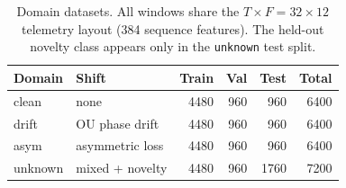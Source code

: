 \begin{table}[t]
\centering
\caption{Domain datasets. All windows share the $T{\times}F = 32{\times}12$ telemetry layout (384 sequence features). The held-out novelty class appears only in the \texttt{unknown} test split.}
\label{tab:datasets}
\begin{tabular}{llrrrr}
\toprule
Domain & Shift & Train & Val & Test & Total \\
\midrule
clean & none & 4480 & 960 & 960 & 6400 \\
drift & OU phase drift & 4480 & 960 & 960 & 6400 \\
asym & asymmetric loss & 4480 & 960 & 960 & 6400 \\
unknown & mixed + novelty & 4480 & 960 & 1760 & 7200 \\
\bottomrule
\end{tabular}
\end{table}
